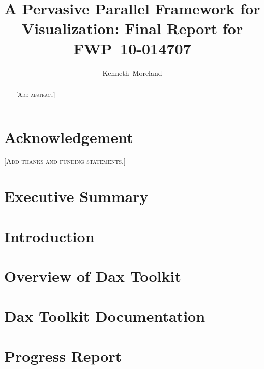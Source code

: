 \documentclass[12pt,report]{SANDreport}
\title{A Pervasive Parallel Framework for Visualization: Final Report for
  FWP~10-014707}
\author{Kenneth~Moreland}
\date{} %
\newcommand{\fix}[1]{{\color{red}\textsc{[#1]}}}
\begin{document}
\maketitle

\begin{abstract}
  \fix{Add abstract}
\end{abstract}

\clearpage

\chapter*{Acknowledgement}

\fix{Add thanks and funding statements.}

\cleardoublepage %
\tableofcontents
\listoffigures
\listoftables

\clearpage

\chapter*{Executive Summary}



\SANDmain %

\chapter{Introduction}
\label{chap:Introduction}



\chapter{Overview of Dax Toolkit}
\label{chap:Overview}



\chapter{Dax Toolkit Documentation}
\label{chap:Documentation}



\chapter{Progress Report}
\label{chap:ProgressReport}



\clearpage

\providecommand*{\phantomsection}{}
\phantomsection
{}




\end{document}
